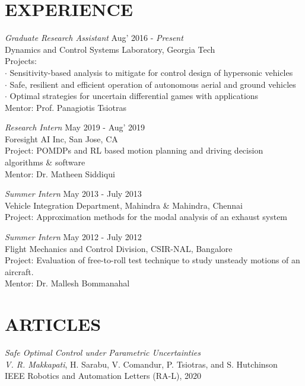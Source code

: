 \documentclass[margin, 10pt]{res} %
\begin{document}
\begin{resume}
\section{EXPERIENCE}

{\sl Graduate Research Assistant} \hfill Aug' 2016 - \emph{Present} \\
Dynamics and Control Systems Laboratory, Georgia Tech\\
Projects:\\
$\cdot$ Sensitivity-based analysis to mitigate for control design of hypersonic vehicles\\
$\cdot$ Safe, resilient and efficient operation of autonomous aerial and ground vehicles\\
$\cdot$ Optimal strategies for uncertain differential games with applications\\
Mentor: Prof. Panagiotis Tsiotras

{\sl Research Intern} \hfill May 2019 - Aug' 2019 \\
Foresight AI Inc, San Jose, CA \\
Project: POMDPs and RL based motion planning and driving decision algorithms \& software \\
Mentor: Dr. Matheen Siddiqui

{\sl Summer Intern} \hfill May 2013 - July 2013 \\
Vehicle Integration Department, Mahindra \& Mahindra, Chennai \\
Project: Approximation methods for the modal analysis of an exhaust system

{\sl Summer Intern} \hfill May 2012 - July 2012 \\
Flight Mechanics and Control Division, CSIR-NAL, Bangalore \\
Project: Evaluation of free-to-roll test technique to study unsteady motions of an aircraft. \\
Mentor: Dr. Mallesh Bommanahal


\section{ARTICLES} 

{\sl Safe Optimal Control under Parametric Uncertainties}\\
\textit{V. R. Makkapati}, H. Sarabu, V. Comandur, P. Tsiotras, and S. Hutchinson \\
IEEE Robotics and Automation Letters (RA-L), 2020


\end{resume}
\end{document}
